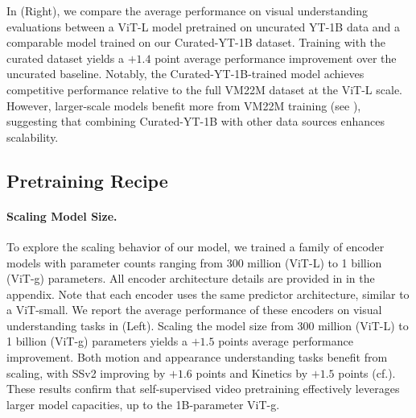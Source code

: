 \documentclass[]{fairmeta}
\begin{document}
In  (Right), we compare the average performance on visual understanding evaluations between a ViT-L model pretrained on uncurated YT-1B data and a comparable model trained on our Curated-YT-1B dataset. Training with the curated dataset yields a $+1.4$ point average performance improvement over the uncurated baseline. Notably, the Curated-YT-1B-trained model achieves competitive performance relative to the full VM22M dataset at the ViT-L scale. However, larger-scale models benefit more from VM22M training (see ), suggesting that combining Curated-YT-1B with other data sources enhances scalability.


\subsection{Pretraining Recipe}
\label{subsec:model_training}

\paragraph{\bf Scaling Model Size.}
To explore the scaling behavior of our model, we trained a family of encoder models with parameter counts ranging from 300 million (ViT-L) to 1 billion (ViT-g) parameters. All encoder architecture details are provided in  in the appendix. Note that each encoder uses the same predictor architecture, similar to a ViT-small.
We report the average performance of these encoders on visual understanding tasks in  (Left). Scaling the model size from 300 million (ViT-L) to 1 billion (ViT-g) parameters yields a $+1.5$ points average performance improvement. Both motion and appearance understanding tasks benefit from scaling, with SSv2 improving by $+1.6$ points and Kinetics by $+1.5$ points (cf.). These results confirm that self-supervised video pretraining effectively leverages larger model capacities, up to the 1B-parameter ViT-g.
\end{document}
